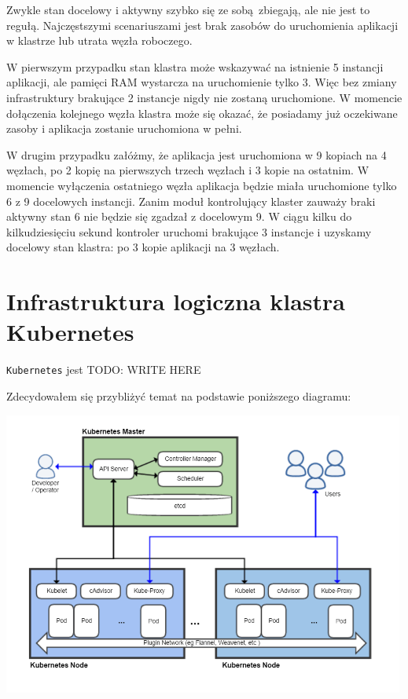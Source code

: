 \documentclass[a4paper,12pt,twoside,openany]{report}
\newcommand{\passthrough}[1]{#1}
\begin{document}
Zwykle stan docelowy i aktywny szybko się ze sobą~zbiegają, ale nie jest
to regułą. Najczęstszymi scenariuszami jest brak zasobów do uruchomienia
aplikacji w klastrze lub utrata węzła roboczego.

W pierwszym przypadku stan klastra może wskazywać na istnienie 5
instancji aplikacji, ale pamięci RAM wystarcza na uruchomienie tylko 3.
Więc bez zmiany infrastruktury brakujące 2 instancje nigdy nie zostaną
uruchomione. W momencie dołączenia kolejnego węzła klastra może się
okazać, że posiadamy już oczekiwane zasoby i aplikacja zostanie
uruchomiona w pełni.

W drugim przypadku załóżmy, że aplikacja jest uruchomiona w 9 kopiach na
4 węzłach, po 2 kopię na pierwszych trzech węzłach i 3 kopie na
ostatnim. W momencie wyłączenia ostatniego węzła aplikacja będzie miała
uruchomione tylko 6 z 9 docelowych instancji. Zanim moduł kontrolujący
klaster zauważy braki aktywny stan 6 nie będzie się zgadzał z docelowym
9. W ciągu kilku do kilkudziesięciu sekund kontroler uruchomi brakujące
3 instancje i uzyskamy docelowy stan klastra: po 3 kopie aplikacji na 3
węzłach.

\hypertarget{infrastruktura-logiczna-klastra-kubernetes}{%
\section{Infrastruktura logiczna klastra
Kubernetes}\label{infrastruktura-logiczna-klastra-kubernetes}}

\passthrough{\lstinline!Kubernetes!} jest TODO: WRITE HERE

Zdecydowałem się przybliżyć temat na podstawie poniższego diagramu:

\includegraphics[width=5.20833in,height=3.6875in]{assets/kubernetes-architecture.png}\\
\end{document}
